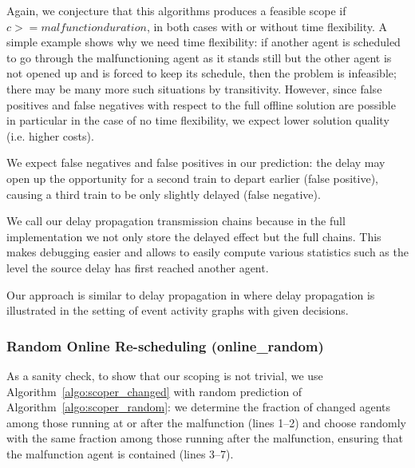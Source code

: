 \documentclass{article}
\begin{document}
Again, we conjecture that this algorithms produces a feasible scope if $c >= malfunction duration$, in both cases with or without time flexibility.
%
A simple example shows why we need time flexibility: if another agent is scheduled to go through the malfunctioning agent as it stands still but the other agent is not opened up and is forced to keep its schedule, then the problem is infeasible; there may be many more such situations by transitivity.
%
However, since false positives and false negatives with respect to the full offline solution are possible in particular in the case of no time flexibility, we expect lower solution quality (i.e. higher costs).

We expect false negatives and false positives in our prediction: the delay may open up the opportunity for a second train to depart earlier (false positive), causing a third train to be only slightly delayed (false negative).


We call our delay propagation transmission chains because in the full implementation we not only store the delayed effect but the full chains. This makes debugging easier and allows to easily compute various statistics such as the level the source delay has first reached another agent.

Our approach is similar to delay propagation in \cite{handbookofoptimizationinrailwayindustry} where delay propagation is illustrated in the setting of event activity graphs with given decisions.


\subsubsection{Random Online Re-scheduling (online\_random)}
\label{subsubsec:scope_online_random}

As a sanity check, to show that our scoping is not trivial, we use Algorithm~\ref{algo:scoper_changed} with random prediction of Algorithm~\ref{algo:scoper_random}: we determine the fraction of changed agents among those running at or after the malfunction (lines 1--2) and choose randomly with the same fraction among those running after the malfunction, ensuring that the malfunction agent is contained (lines 3--7).
\end{document}
